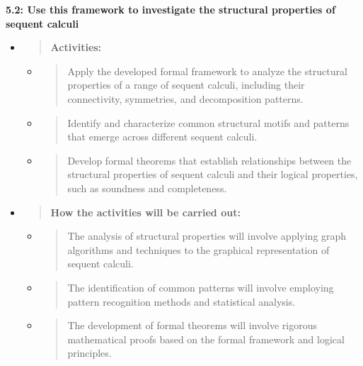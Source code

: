 \textbf{5.2: Use this framework to investigate the structural properties
of sequent calculi}

\begin{itemize}
\item
  \begin{quote}
  \textbf{Activities:}
  \end{quote}

  \begin{itemize}
  \item
    \begin{quote}
    Apply the developed formal framework to analyze the structural
    properties of a range of sequent calculi, including their
    connectivity, symmetries, and decomposition patterns.
    \end{quote}
  \item
    \begin{quote}
    Identify and characterize common structural motifs and patterns that
    emerge across different sequent calculi.
    \end{quote}
  \item
    \begin{quote}
    Develop formal theorems that establish relationships between the
    structural properties of sequent calculi and their logical
    properties, such as soundness and completeness.
    \end{quote}
  \end{itemize}
\item
  \begin{quote}
  \textbf{How the activities will be carried out:}
  \end{quote}

  \begin{itemize}
  \item
    \begin{quote}
    The analysis of structural properties will involve applying graph
    algorithms and techniques to the graphical representation of sequent
    calculi.
    \end{quote}
  \item
    \begin{quote}
    The identification of common patterns will involve employing pattern
    recognition methods and statistical analysis.
    \end{quote}
  \item
    \begin{quote}
    The development of formal theorems will involve rigorous
    mathematical proofs based on the formal framework and logical
    principles.
    \end{quote}
  \end{itemize}
\end{itemize}

